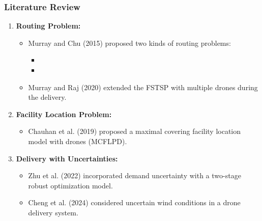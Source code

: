 \documentclass[aspectratio=169]{beamer}
\begin{document}
\begin{frame}
\frametitle{Literature Review}
    \begin{enumerate}[label=\arabic*.]
        \item \textbf{Routing Problem:} 
        \begin{itemize}[label=$\star$]
          \item Murray and Chu (2015) \cite{murray2015flying} proposed two kinds of routing problems:
          \begin{itemize}[label=$\diamond$]
            \item {}
            \item {}
          \end{itemize}
          \item Murray and Raj (2020)\cite{murray2020multiple} extended the FSTSP with multiple drones during the delivery.
        \end{itemize}
        \item \textbf{Facility Location Problem:}
        \begin{itemize}[label=$\diamond$] 
          \item Chauhan et al. (2019) \cite{chauhan2019maximum} proposed a maximal covering facility location model with drones (MCFLPD).
        \end{itemize}
        \item \textbf{Delivery with Uncertainties:}
        \begin{itemize}[label=$\diamond$]
          \item Zhu et al. (2022) \cite{zhu2022two} incorporated demand uncertainty with a two-stage robust optimization model.
          \item Cheng et al. (2024) \cite{cheng2024robust} considered uncertain wind conditions in a drone delivery system.
        \end{itemize}
    \end{enumerate}
\end{frame}
\end{document}
